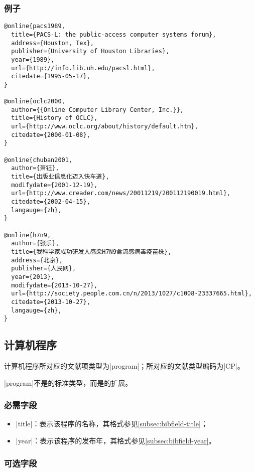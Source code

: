 \subsubsection{例子}

\begin{verbatim}
@online{pacs1989,
  title={PACS-L: the public-access computer systems forum},
  address={Houston, Tex},
  publisher={University of Houston Libraries},
  year={1989},
  url={http://info.lib.uh.edu/pacsl.html},
  citedate={1995-05-17},
}

@online{oclc2000,
  author={{Online Computer Library Center, Inc.}},
  title={History of OCLC},
  url={http://www.oclc.org/about/history/default.htm},
  citedate={2000-01-08},
}

@online{chuban2001,
  author={萧钰},
  title={出版业信息化迈入快车道},
  modifydate={2001-12-19},
  url={http://www.creader.com/news/20011219/200112190019.html},
  citedate={2002-04-15},
  langauge={zh},
}

@online{h7n9,
  author={张乐},
  title={我科学家成功研发人感染H7N9禽流感病毒疫苗株},
  address={北京},
  publisher={人民网}, 
  year={2013},
  modifydate={2013-10-27},
  url={http://society.people.com.cn/n/2013/1027/c1008-23337665.html},
  citedate={2013-10-27},
  langauge={zh},
}
\end{verbatim}


\subsection{计算机程序}\label{subsec:bibtype-program}

计算机程序所对应的{\BibTeX}文献项类型为|program|；所对应的文献类型编码为|CP|\cite{gbt7714-2005}。

|program|不是{\BibTeX}的标准类型，而是{\njuthesis}的扩展。

\subsubsection{必需字段}

\begin{itemize}
\item |title|：表示该程序的名称，其格式参见\ref{subsec:bibfield-title}；
\item |year|：表示该程序的发布年，其格式参见\ref{subsec:bibfield-year}。
\end{itemize}

\subsubsection{可选字段}

